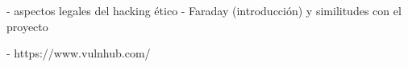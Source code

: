 - aspectos legales del hacking ético
- Faraday (introducción) y similitudes con el proyecto

- https://www.vulnhub.com/

